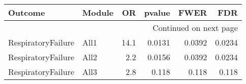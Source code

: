 \documentclass[10pt]{article}
\begin{document}
\begin{longtable}{llrrrr}
\toprule
            Outcome & Module &   OR &  pvalue &   FWER &    FDR \\
\midrule
\endhead
\midrule
\multicolumn{6}{r}{{Continued on next page}} \\
\midrule
\endfoot

\bottomrule
\endlastfoot
 RespiratoryFailure &   All1 & 14.1 &  0.0131 & 0.0392 & 0.0234 \\
 RespiratoryFailure &   All2 &  2.2 &  0.0156 & 0.0392 & 0.0234 \\
 RespiratoryFailure &   All3 &  2.8 &   0.118 &  0.118 &  0.118 \\
\end{longtable}
\end{document}
